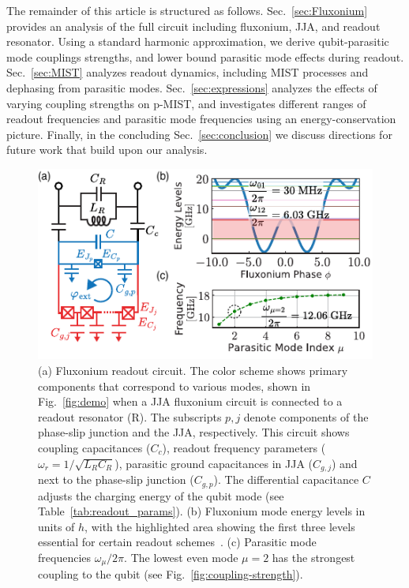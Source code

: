 \documentclass[%
reprint,
superscriptaddress,
 amsmath,amssymb,
 aps,
 prx,
longbibliography,
floatfix,
]{revtex4-2}
\begin{document}
The remainder of this article is structured as follows. Sec.~\ref{sec:Fluxonium}
provides an analysis of the full circuit including fluxonium, JJA, and readout resonator.  Using a standard harmonic approximation, we derive qubit-parasitic mode couplings strengths, and lower bound parasitic mode effects during readout. Sec.~\ref{sec:MIST} analyzes readout dynamics, including MIST processes and dephasing from parasitic modes. Sec.~\ref{sec:expressions} analyzes the effects of varying coupling strengths on p-MIST, and investigates different ranges of readout frequencies and parasitic mode frequencies using an energy-conservation picture. Finally, in the concluding Sec.~\ref{sec:conclusion} we discuss directions for future work that build upon our analysis.

\begin{figure}[t]
\centering    
\includegraphics[width=\linewidth]{Figures/Meas_Circuit.pdf}
\caption{(a) Fluxonium readout circuit. The color scheme shows primary components that correspond to various modes, shown in Fig.~\ref{fig:demo} when a JJA fluxonium circuit is connected to a readout resonator (R). The subscripts $p,j$ denote components of the phase-slip junction and the JJA, respectively. This circuit shows coupling capacitances ($C_c$), readout frequency parameters ($\omega_r=1/\sqrt{L_{R}C_{R}}$), parasitic ground capacitances in JJA ($C_{g,j}$) and next to the phase-slip junction ($C_{g,p}$). The differential capacitance $C$ adjusts the charging energy of the qubit mode (see Table~\ref{tab:readout_params}). (b) Fluxonium mode energy levels in units of $h$, with the highlighted area showing the first three levels essential for certain readout schemes~\cite{zhang_universal_2021}. (c) Parasitic mode frequencies $\omega_\mu/2\pi$. The lowest even mode $\mu = 2$ has the strongest coupling to the qubit (see Fig.~\ref{fig:coupling-strength}). 
}
\label{fig:meas_circuit}
\end{figure}
\end{document}
